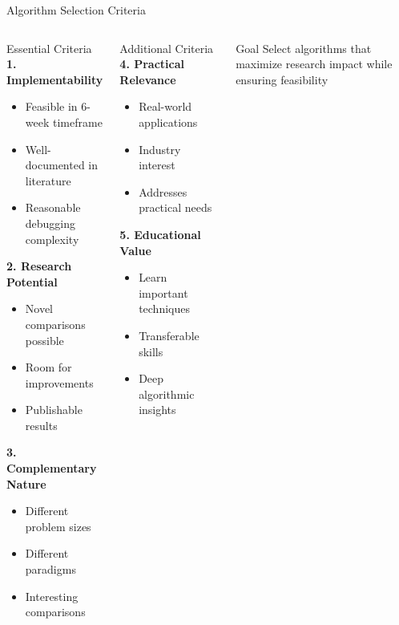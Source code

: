 \documentclass[aspectratio=169]{beamer}
\begin{document}
\begin{frame}{Algorithm Selection Criteria}
	\begin{columns}[T]
		\begin{block}{Essential Criteria}
			\footnotesize
			\textbf{1. Implementability}
			\begin{itemize}
				\item Feasible in 6-week timeframe
				\item Well-documented in literature
				\item Reasonable debugging complexity
			\end{itemize}

			\textbf{2. Research Potential}
			\begin{itemize}
				\item Novel comparisons possible
				\item Room for improvements
				\item Publishable results
			\end{itemize}

			\textbf{3. Complementary Nature}
			\begin{itemize}
				\item Different problem sizes
				\item Different paradigms
				\item Interesting comparisons
			\end{itemize}
		\end{block}

		\begin{block}{Additional Criteria}
			\footnotesize
			\textbf{4. Practical Relevance}
			\begin{itemize}
				\item Real-world applications
				\item Industry interest
				\item Addresses practical needs
			\end{itemize}

			\textbf{5. Educational Value}
			\begin{itemize}
				\item Learn important techniques
				\item Transferable skills
				\item Deep algorithmic insights
			\end{itemize}
		\end{block}

		\begin{alertblock}{Goal}
			\footnotesize
			Select algorithms that maximize research impact while ensuring feasibility
		\end{alertblock}
	\end{columns}
\end{frame}
\end{document}
